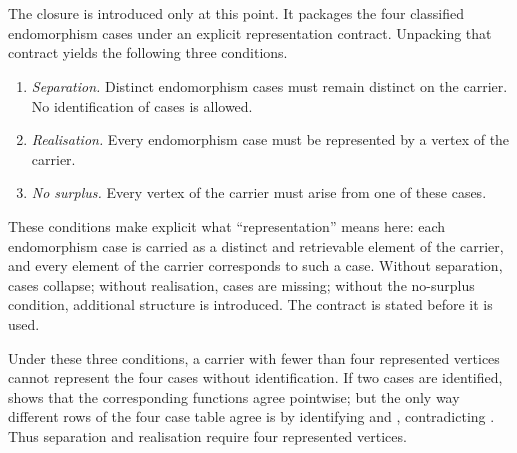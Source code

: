 \documentclass[11pt]{article}
\begin{document}
\begin{code}
\AgdaSymbol{(}\AgdaSpace{}%
\AgdaSymbol{)}\AgdaSpace{}%
\AgdaSymbol{(}\AgdaSpace{}%
\AgdaSpace{}%
\AgdaSpace{}%
\AgdaSpace{}%
\AgdaSymbol{))}\<%
\\
\>[0]\AgdaSpace{}%
\AgdaSpace{}%
\AgdaSpace{}%
\AgdaSymbol{=}\<%
\\
\>[0][@{}l@{\AgdaIndent{0}}]%
\>[2]\AgdaSpace{}%
\AgdaSpace{}%
\AgdaSpace{}%
\AgdaOperator{\AgdaInductiveConstructor{,}}\AgdaSpace{}%
\AgdaSpace{}%
\AgdaSpace{}%
\AgdaSpace{}%
\AgdaSpace{}%
\AgdaSymbol{(}\AgdaSpace{}%
\AgdaSymbol{(}\AgdaSpace{}%
\AgdaSpace{}%
\AgdaSpace{}%
\AgdaSpace{}%
\AgdaSymbol{)}\AgdaSpace{}%
\AgdaSymbol{)}\<%
\end{code}

The closure is introduced only at this point.  It packages the four
classified endomorphism cases under an explicit representation contract.
Unpacking that contract yields the following three conditions.

\begin{enumerate}
\item \emph{Separation.} Distinct endomorphism cases must remain
  distinct on the carrier.  No identification of cases is allowed.
\item \emph{Realisation.} Every endomorphism case must be represented
  by a vertex of the carrier.
\item \emph{No surplus.} Every vertex of the carrier must arise from
  one of these cases.
\end{enumerate}

These conditions make explicit what ``representation'' means here: each
endomorphism case is carried as a distinct and retrievable element of
the carrier, and every element of the carrier corresponds to such a
case.  Without separation, cases collapse; without realisation, cases
are missing; without the no-surplus condition, additional structure is
introduced.  The contract is stated before it is used.

Under these three conditions, a carrier with fewer than four represented
vertices cannot represent the four cases without identification.  If two
cases are identified,  shows that the
corresponding functions agree pointwise; but the only way different rows
of the four case table agree is by identifying
 and ,
contradicting .  Thus separation and realisation
require four represented vertices.
\end{document}
